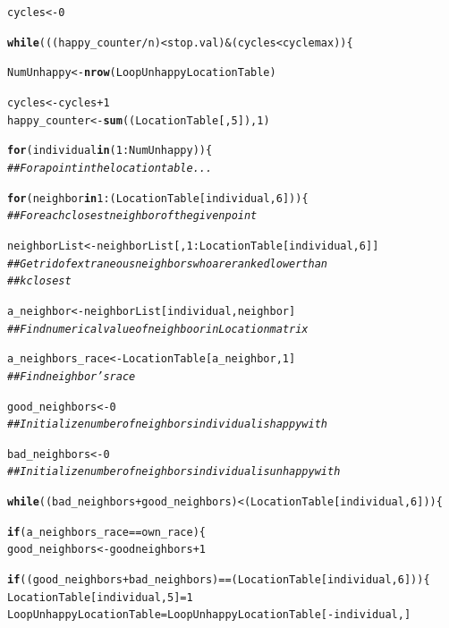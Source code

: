 \documentclass{article}\usepackage[]{graphicx}\usepackage[]{color}
\makeatletter
\newcommand{\hlnum}[1]{\textcolor[rgb]{0.686,0.059,0.569}{#1}}%
\newcommand{\hlcom}[1]{\textcolor[rgb]{0.678,0.584,0.686}{\textit{#1}}}%
\newcommand{\hlopt}[1]{\textcolor[rgb]{0,0,0}{#1}}%
\newcommand{\hlstd}[1]{\textcolor[rgb]{0.345,0.345,0.345}{#1}}%
\newcommand{\hlkwa}[1]{\textcolor[rgb]{0.161,0.373,0.58}{\textbf{#1}}}%
\newcommand{\hlkwb}[1]{\textcolor[rgb]{0.69,0.353,0.396}{#1}}%
\newcommand{\hlkwd}[1]{\textcolor[rgb]{0.737,0.353,0.396}{\textbf{#1}}}%
\newenvironment{kframe}{%
 \def\at@end@of@kframe{}%
 \ifinner\ifhmode%
  \def\at@end@of@kframe{\end{minipage}}%
  \begin{minipage}{\columnwidth}%
 \fi\fi%
 \def\FrameCommand##1{\hskip\@totalleftmargin \hskip-\fboxsep
 \colorbox{shadecolor}{##1}\hskip-\fboxsep
     \hskip-\linewidth \hskip-\@totalleftmargin \hskip\columnwidth}%
 \MakeFramed {\advance\hsize-\width
   \@totalleftmargin\z@ \linewidth\hsize
   \@setminipage}}%
 {\par\unskip\endMakeFramed%
 \at@end@of@kframe}
\newenvironment{knitrout}{}{} %
\makeatother
\begin{document}
\begin{knitrout}
\begin{kframe}
\begin{alltt}
  \hlstd{cycles} \hlkwb{<-} \hlnum{0}


\hlkwa{while} \hlstd{(((happy_counter}\hlopt{/}\hlstd{n)} \hlopt{<} \hlstd{stop.val)} \hlopt{&} \hlstd{(cycles} \hlopt{<} \hlstd{cyclemax))\{}

     \hlstd{NumUnhappy} \hlkwb{<-} \hlkwd{nrow}\hlstd{(LoopUnhappyLocationTable)}

     \hlstd{cycles} \hlkwb{<-} \hlstd{cycles} \hlopt{+} \hlnum{1}
     \hlstd{happy_counter}\hlkwb{<-} \hlkwd{sum}\hlstd{((LocationTable[,}\hlnum{5}\hlstd{]),} \hlnum{1}\hlstd{)}

     \hlkwa{for} \hlstd{(individual} \hlkwa{in} \hlstd{(}\hlnum{1}\hlopt{:}\hlstd{NumUnhappy))\{}
     \hlcom{##For a point in the location table...}

       \hlkwa{for} \hlstd{(neighbor} \hlkwa{in} \hlnum{1}\hlopt{:}\hlstd{(LocationTable[individual,}\hlnum{6}\hlstd{]))\{}
       \hlcom{## For each closest neighbor of the given point}

         \hlstd{neighborList} \hlkwb{<-} \hlstd{neighborList[,}\hlnum{1}\hlopt{:}\hlstd{LocationTable[individual,}\hlnum{6}\hlstd{]]}
         \hlcom{##Get rid of extraneous neighbors who are ranked lower than}
         \hlcom{## k closest}

         \hlstd{a_neighbor} \hlkwb{<-} \hlstd{neighborList[individual,neighbor]}
         \hlcom{## Find numerical value of neighboor in Location matrix}

         \hlstd{a_neighbors_race} \hlkwb{<-} \hlstd{LocationTable[a_neighbor,}\hlnum{1}\hlstd{]}
         \hlcom{## Find neighbor's race}

        \hlstd{good_neighbors} \hlkwb{<-} \hlnum{0}
        \hlcom{##Initialize number of neighbors individual is happy with}

        \hlstd{bad_neighbors} \hlkwb{<-} \hlnum{0}
        \hlcom{## Initialize number of neighbors individual is unhappy with  }

           \hlkwa{while} \hlstd{((bad_neighbors} \hlopt{+} \hlstd{good_neighbors)} \hlopt{<} \hlstd{(LocationTable[individual,}\hlnum{6}\hlstd{]))\{}

             \hlkwa{if} \hlstd{(a_neighbors_race} \hlopt{==} \hlstd{own_race)\{}
             \hlstd{good_neighbors} \hlkwb{<-} \hlstd{goodneighbors} \hlopt{+} \hlnum{1}

               \hlkwa{if} \hlstd{((good_neighbors} \hlopt{+} \hlstd{bad_neighbors)} \hlopt{==} \hlstd{(LocationTable[individual,}\hlnum{6}\hlstd{]))\{}
                 \hlstd{LocationTable[individual,}\hlnum{5}\hlstd{]} \hlkwb{=} \hlnum{1}
                 \hlstd{LoopUnhappyLocationTable} \hlkwb{=} \hlstd{LoopUnhappyLocationTable[}\hlopt{-}\hlstd{individual,]}


\end{alltt}
\end{kframe}
\end{knitrout}
\end{document}
